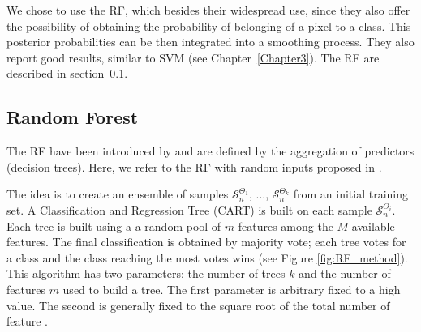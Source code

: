 We chose to use the RF, which besides their widespread use, since they also offer the possibility of obtaining the probability of belonging of a pixel to a class. This posterior probabilities can be then integrated into a smoothing process. They also report good results, similar to SVM (see Chapter~\ref{Chapter3}). The RF are described in section~\ref{sec:RF}.

\subsection{Random Forest}
\label{sec:RF}
The RF have been introduced by \cite{breiman2001random} and are defined by the aggregation of predictors (decision trees). Here, we refer to the RF with random inputs proposed in \cite{breiman2001random}.

The idea is to create an ensemble of samples $\mathcal{S}_{n}^{\Theta_{1}}$, ..., $\mathcal{S}_{n}^{\Theta_{k}}$ from an initial training set. A Classification and Regression Tree (CART) \citep{breiman1984classification} is built on each sample $\mathcal{S}_{n}^{\Theta_{i}}$. Each tree is built using a a random pool of $m$ features among the $M$ available features. The final classification is obtained by majority vote; each tree votes for a class and the class reaching the most votes wins (see Figure \ref{fig:RF_method}). This algorithm has two parameters: the number of trees $k$ and the number of features $m$ used to build a tree. The first parameter is arbitrary fixed to a high value. The second is generally fixed to the square root of the total number of feature \citep{gislason2006random}.

